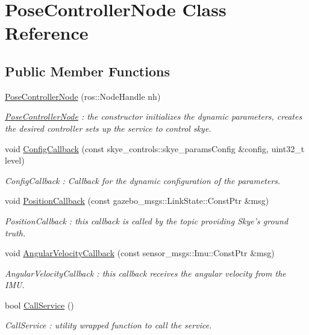 \hypertarget{class_pose_controller_node}{\section{Pose\-Controller\-Node Class Reference}
\label{class_pose_controller_node}
}
\subsection*{Public Member Functions}
\begin{DoxyCompactItemize}
\item 
\hyperlink{class_pose_controller_node_a17466a8314ad354402401ba27157594c}{Pose\-Controller\-Node} (ros\-::\-Node\-Handle nh)
\begin{DoxyCompactList}\small\item\em \hyperlink{class_pose_controller_node}{Pose\-Controller\-Node} \-: the constructor initializes the dynamic parameters, creates the desired controller sets up the service to control skye. \end{DoxyCompactList}\item 
void \hyperlink{class_pose_controller_node_aab9762d618a38b99cbfbcaecd2163606}{Config\-Callback} (const skye\-\_\-controls\-::skye\-\_\-params\-Config \&config, uint32\-\_\-t level)
\begin{DoxyCompactList}\small\item\em Config\-Callback \-: Callback for the dynamic configuration of the parameters. \end{DoxyCompactList}\item 
void \hyperlink{class_pose_controller_node_ac4582290cf6ff6b5cd9564fd386c3b39}{Position\-Callback} (const gazebo\-\_\-msgs\-::\-Link\-State\-::\-Const\-Ptr \&msg)
\begin{DoxyCompactList}\small\item\em Position\-Callback \-: this callback is called by the topic providing Skye's ground truth. \end{DoxyCompactList}\item 
void \hyperlink{class_pose_controller_node_a1804624b5c2f57b08fcd1c50b8118cd7}{Angular\-Velocity\-Callback} (const sensor\-\_\-msgs\-::\-Imu\-::\-Const\-Ptr \&msg)
\begin{DoxyCompactList}\small\item\em Angular\-Velocity\-Callback \-: this callback receives the angular velocity from the I\-M\-U. \end{DoxyCompactList}\item 
bool \hyperlink{class_pose_controller_node_a0b12265a62dad33caa6063f5cb582c80}{Call\-Service} ()
\begin{DoxyCompactList}\small\item\em Call\-Service \-: utility wrapped function to call the service. \end{DoxyCompactList}\end{DoxyCompactItemize}


